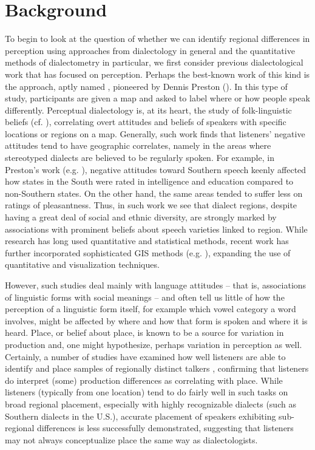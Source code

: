 \documentclass[output=paper]{LSP/langsci}
\begin{document}
\section{Background}
To begin to look at the question of whether we can identify regional differences in perception using approaches from dialectology in general and the quantitative methods of dialectometry in particular, we first consider previous dialectological work that has focused on perception. Perhaps the best-known work of this kind is the approach, aptly named \textsc{}, pioneered by Dennis Preston (\citeyear{preston_perceptual_1989,preston_folk_1993}). In this type of study, participants are given a map and asked to label where or how people speak differently. Perceptual dialectology is, at its heart, the study of folk-linguistic beliefs (cf. \citealt{niedzielski_folk_1999}), correlating overt attitudes and beliefs of speakers with specific locations or regions on a map. Generally, such work finds that listeners’ negative attitudes tend to have geographic correlates, namely in the areas where stereotyped dialects are believed to be regularly spoken. For example, in Preston’s work (e.g. \citeyear{preston_perceptual_1989}), negative attitudes toward Southern speech keenly affected how states in the South were rated in intelligence and education compared to non-Southern states. On the other hand, the same areas tended to suffer less on ratings of pleasantness. Thus, in such work we see that dialect regions, despite having a great deal of social and ethnic diversity, are strongly marked by associations with prominent beliefs about speech varieties linked to region. While  research has long used quantitative and statistical methods, recent work has further incorporated sophisticated GIS methods (e.g. \citealt{evans_seattle_2013}), expanding the use of quantitative and visualization techniques.

However, such studies deal mainly with language attitudes – that is, associations of linguistic forms with social meanings – and often tell us little of how the perception of a linguistic form itself, for example which vowel category a word involves, might be affected by where and how that form is spoken and where it is heard. Place, or belief about place, is known to be a source for variation in production and, one might hypothesize, perhaps variation in perception as well. Certainly, a number of studies have examined how well listeners are able to identify and place samples of regionally distinct talkers \citep{clopper_acoustic_2004,clopper_free_2007,preston_where_1996,van_bezooijen_identification_1999}, confirming that listeners do interpret (some) production differences as correlating with place. While listeners (typically from one location) tend to do fairly well in such tasks on broad regional placement, especially with highly recognizable dialects (such as Southern dialects in the U.S.), accurate placement of speakers exhibiting sub-regional differences is less successfully demonstrated, suggesting that listeners may not always conceptualize place the same way as dialectologists.  
\end{document}
